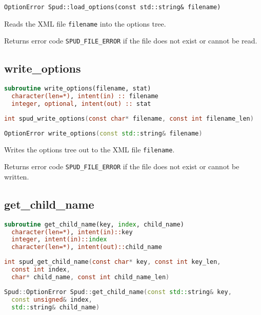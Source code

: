 \documentclass[a4paper, 11pt]{book}
\begin{document}
\begin{lstlisting}
OptionError Spud::load_options(const std::string& filename)
\end{lstlisting}

Reads the XML file \lstinline+filename+ into the options tree.

Returns error code \lstinline+SPUD_FILE_ERROR+ if the file does not exist or cannot be read.

\subsection{write\_options}

\begin{lstlisting}[language=fortran]
subroutine write_options(filename, stat)
  character(len=*), intent(in) :: filename
  integer, optional, intent(out) :: stat
\end{lstlisting}

\begin{lstlisting}[language=C]
int spud_write_options(const char* filename, const int filename_len)
\end{lstlisting}

\begin{lstlisting}[language=C++]
OptionError write_options(const std::string& filename)
\end{lstlisting}

Writes the options tree out to the XML file \lstinline+filename+.

Returns error code \lstinline+SPUD_FILE_ERROR+ if the file does not exist or cannot be written.

\subsection{get\_child\_name}

\begin{lstlisting}[language=fortran]
subroutine get_child_name(key, index, child_name)
  character(len=*), intent(in)::key
  integer, intent(in)::index
  character(len=*), intent(out)::child_name
\end{lstlisting}

\begin{lstlisting}[language=C]
int spud_get_child_name(const char* key, const int key_len,
  const int index,
  char* child_name, const int child_name_len)
\end{lstlisting}

\begin{lstlisting}[language=C++]
Spud::OptionError Spud::get_child_name(const std::string& key,
  const unsigned& index,
  std::string& child_name)
\end{lstlisting}
\end{document}

